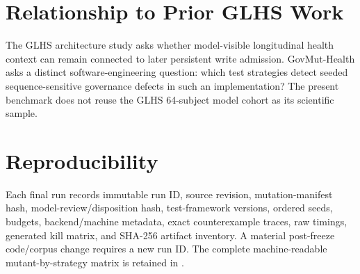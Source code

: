 \documentclass[conference]{IEEEtran}
\begin{document}
\section{Relationship to Prior GLHS Work}
The GLHS architecture study asks whether model-visible longitudinal health context can remain connected to later persistent write admission. GovMut-Health asks a distinct software-engineering question: which test strategies detect seeded sequence-sensitive governance defects in such an implementation? The present benchmark does not reuse the GLHS 64-subject model cohort as its scientific sample.

\section{Reproducibility}
Each final run records immutable run ID, source revision, mutation-manifest hash, model-review/disposition hash, test-framework versions, ordered seeds, budgets, backend/machine metadata, exact counterexample traces, raw timings, generated kill matrix, and SHA-256 artifact inventory. A material post-freeze code/corpus change requires a new run ID. The complete machine-readable mutant-by-strategy matrix is retained in .
\end{document}

